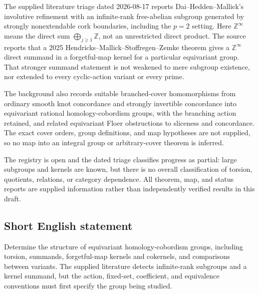 \documentclass[11pt]{article}
\newcommand{\Z}{\mathbb{Z}}
\begin{document}
The supplied literature triage dated 2026-08-17 reports Dai--Hedden--Mallick's involutive refinement with an infinite-rank free-abelian subgroup generated by strongly nonextendable cork boundaries, including the $p=2$ setting. Here $\Z^\infty$ means the direct sum $\bigoplus_{j\geq1}\Z$, not an unrestricted direct product. The source reports that a 2025 Hendricks--Mallick--Stoffregen--Zemke theorem gives a $\Z^\infty$ direct summand in a forgetful-map kernel for a particular equivariant group. That stronger summand statement is not weakened to mere subgroup existence, nor extended to every cyclic-action variant or every prime.

The background also records suitable branched-cover homomorphisms from ordinary smooth knot concordance and strongly invertible concordance into equivariant rational homology-cobordism groups, with the branching action retained, and related equivariant Floer obstructions to sliceness and concordance. The exact cover orders, group definitions, and map hypotheses are not supplied, so no map into an integral group or arbitrary-cover theorem is inferred.

The registry is open and the dated triage classifies progress as partial: large subgroups and kernels are known, but there is no overall classification of torsion, quotients, relations, or category dependence. All theorem, map, and status reports are supplied information rather than independently verified results in this draft.
\subsection{Short English statement}
Determine the structure of equivariant homology-cobordism groups, including torsion, summands, forgetful-map kernels and cokernels, and comparisons between variants. The supplied literature detects infinite-rank subgroups and a kernel summand, but the action, fixed-set, coefficient, and equivalence conventions must first specify the group being studied.
\end{document}
